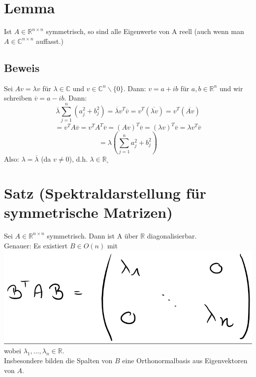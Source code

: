 \documentclass{scrbook}
\begin{document}
\section{Lemma}
Ist $A \in \mathbb{R}^{n \times n}$ symmetrisch, so sind alle Eigenwerte von A reell (auch wenn man $A \in \mathbb{C}^{n \times n}$ auffasst.)
\subsection*{Beweis} Sei $Av = \lambda v$ für $\lambda \in \mathbb{C}$ und $v \in \mathbb{C}^n\backslash \{0\}$. Dann: $v = a+ib$ für $a,b \in \mathbb{R}^n $ und wir schreiben $\overline{v} = a-ib$. Dann:
\[
\overline{\lambda} \sum^n_{j=1} (a_j^2 +b_j^2) = \overline{\lambda} v^T \overline{v} = v^T (\overline{\lambda v}) = v^T (\overline{Av})
\]
\[=v^T A \overline{v} = v^TA^T \overline{v} = (Av)^T \overline{v} = (\lambda v)^T \overline{v} = \lambda v^T \overline{v}\]
\[= \lambda(\sum^n_{j=1} a_j^2 + b_j^2)\]
Also: $\lambda = \overline{\lambda}$ (da $v \neq 0$), d.h. $\lambda \in \mathbb{R} _\square$
\section{Satz (Spektraldarstellung für symmetrische Matrizen)}
Sei $A \in \mathbb{R}^{n\times n}$ symmetrisch. Dann ist A über $ \mathbb{R}$ diagonalisierbar.\\Genauer: Es existiert $B \in O(n)$ mit \\
\includegraphics{Satz_13_3_1.png}\\
wobei $\lambda_1,..., \lambda_n \in \mathbb{R}.$\\
Insbesondere bilden die Spalten von $B$ eine Orthonormalbasis aus Eigenvektoren von $A$.
\end{document}

